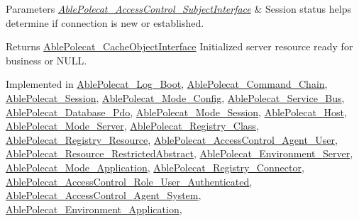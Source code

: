\begin{DoxyParams}{Parameters}
{\em \hyperlink{interface_able_polecat___access_control___subject_interface}{Able\+Polecat\+\_\+\+Access\+Control\+\_\+\+Subject\+Interface}} & Session status helps determine if connection is new or established.\\
\hline
\end{DoxyParams}
\begin{DoxyReturn}{Returns}
\hyperlink{interface_able_polecat___cache_object_interface}{Able\+Polecat\+\_\+\+Cache\+Object\+Interface} Initialized server resource ready for business or N\+U\+L\+L. 
\end{DoxyReturn}


Implemented in \hyperlink{class_able_polecat___log___boot_a3f2135f6ad45f51d075657f6d20db2cd}{Able\+Polecat\+\_\+\+Log\+\_\+\+Boot}, \hyperlink{class_able_polecat___command___chain_a3f2135f6ad45f51d075657f6d20db2cd}{Able\+Polecat\+\_\+\+Command\+\_\+\+Chain}, \hyperlink{class_able_polecat___session_a3f2135f6ad45f51d075657f6d20db2cd}{Able\+Polecat\+\_\+\+Session}, \hyperlink{class_able_polecat___mode___config_a3f2135f6ad45f51d075657f6d20db2cd}{Able\+Polecat\+\_\+\+Mode\+\_\+\+Config}, \hyperlink{class_able_polecat___service___bus_a3f2135f6ad45f51d075657f6d20db2cd}{Able\+Polecat\+\_\+\+Service\+\_\+\+Bus}, \hyperlink{class_able_polecat___database___pdo_a3f2135f6ad45f51d075657f6d20db2cd}{Able\+Polecat\+\_\+\+Database\+\_\+\+Pdo}, \hyperlink{class_able_polecat___mode___session_a3f2135f6ad45f51d075657f6d20db2cd}{Able\+Polecat\+\_\+\+Mode\+\_\+\+Session}, \hyperlink{class_able_polecat___host_a3f2135f6ad45f51d075657f6d20db2cd}{Able\+Polecat\+\_\+\+Host}, \hyperlink{class_able_polecat___mode___server_a3f2135f6ad45f51d075657f6d20db2cd}{Able\+Polecat\+\_\+\+Mode\+\_\+\+Server}, \hyperlink{class_able_polecat___registry___class_a3f2135f6ad45f51d075657f6d20db2cd}{Able\+Polecat\+\_\+\+Registry\+\_\+\+Class}, \hyperlink{class_able_polecat___registry___resource_a3f2135f6ad45f51d075657f6d20db2cd}{Able\+Polecat\+\_\+\+Registry\+\_\+\+Resource}, \hyperlink{class_able_polecat___access_control___agent___user_a3f2135f6ad45f51d075657f6d20db2cd}{Able\+Polecat\+\_\+\+Access\+Control\+\_\+\+Agent\+\_\+\+User}, \hyperlink{class_able_polecat___resource___restricted_abstract_a3f2135f6ad45f51d075657f6d20db2cd}{Able\+Polecat\+\_\+\+Resource\+\_\+\+Restricted\+Abstract}, \hyperlink{class_able_polecat___environment___server_a3f2135f6ad45f51d075657f6d20db2cd}{Able\+Polecat\+\_\+\+Environment\+\_\+\+Server}, \hyperlink{class_able_polecat___mode___application_a3f2135f6ad45f51d075657f6d20db2cd}{Able\+Polecat\+\_\+\+Mode\+\_\+\+Application}, \hyperlink{class_able_polecat___registry___connector_a3f2135f6ad45f51d075657f6d20db2cd}{Able\+Polecat\+\_\+\+Registry\+\_\+\+Connector}, \hyperlink{class_able_polecat___access_control___role___user___authenticated_a3f2135f6ad45f51d075657f6d20db2cd}{Able\+Polecat\+\_\+\+Access\+Control\+\_\+\+Role\+\_\+\+User\+\_\+\+Authenticated}, \hyperlink{class_able_polecat___access_control___agent___system_a3f2135f6ad45f51d075657f6d20db2cd}{Able\+Polecat\+\_\+\+Access\+Control\+\_\+\+Agent\+\_\+\+System}, \hyperlink{class_able_polecat___environment___application_a3f2135f6ad45f51d075657f6d20db2cd}{Able\+Polecat\+\_\+\+Environment\+\_\+\+Application}, 